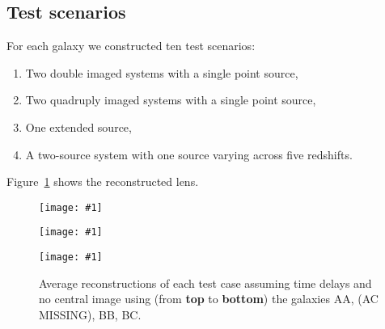\documentclass[onecolumn,galley]{mn2e}
\newcommand{\tabref}[1] {Table~\ref{#1}}
\newcommand{\figref}[1] {Figure~\ref{#1}}
\newcommand\plotone[1]{%
 \centering
 \leavevmode
 \texttt{[image: \#1]}%
}%
\begin{document}
\subsection{Test scenarios} %

For each galaxy we constructed ten test scenarios:
\begin{enumerate}
\item Two double imaged systems with a single point source,
\item Two quadruply imaged systems with a single point source,
\item One extended source, 
\item A two-source system with one source varying across five redshifts. 
\end{enumerate}

\figref{Test reconstructions} shows the reconstructed lens.

\begin{figure}
\plotone{AAarrival_surfaces}
\plotone{BBarrival_surfaces}
\plotone{BCarrival_surfaces}
\caption{Average reconstructions of each test case assuming time delays and no central image
using (from \textbf{top} to \textbf{bottom}) the galaxies AA, (AC MISSING), BB, BC.}
\label{Test reconstructions}
\end{figure}
\end{document}
